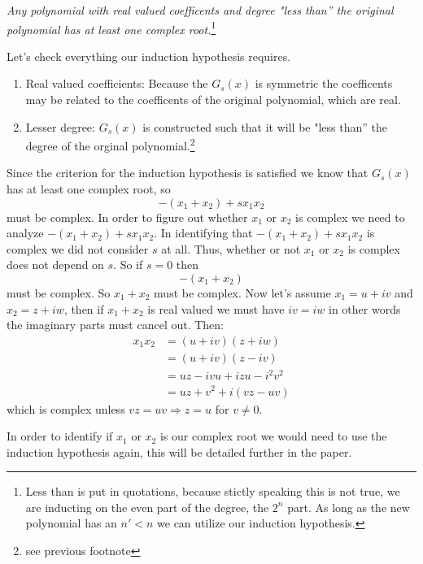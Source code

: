 \documentclass[12pt]{article}
\begin{document}
\emph{Any polynomial with real valued coefficents and degree "less than'' the original polynomial has at least one complex root.}\footnote{Less than is put in quotations, because stictly speaking this is not true, we are inducting on the even part of the degree, the $2^n$ part.  As long as the new polynomial has an $n'<n$ we can utilize our induction hypothesis.}

Let's check everything our induction hypothesis requires.
\begin{enumerate}
\item Real valued coefficients: Because the $G_s(x)$ is symmetric the coefficents may be related to the coefficents of the original polynomial, which are real.
\item Lesser degree: $G_s(x)$ is constructed such that it will be "less than'' the degree of the orginal polynomial.\footnote{see previous footnote}
\end{enumerate}


Since the criterion for the induction hypothesis is satisfied we know that $G_s(x)$ has at least one complex root, so $$-(x_1 +x_2) + s x_1 x_2$$ must be complex.  In order to figure out whether $x_1$ or $x_2$ is complex we need to analyze $-(x_1 +x_2) + s x_1 x_2$.  In identifying that $-(x_1 +x_2) + s x_1 x_2$ is complex we did not consider $s$ at all.  Thus, whether or not $x_1$ or $x_2$ is complex does not depend on $s$.  So if $s=0$ then $$ -(x_1+x_2)$$ must be complex.  So $x_1+x_2$ must be complex.  Now let's assume $x_1 = u+iv$ and $x_2 = z+iw$, then if $x_1+x_2$ is real valued we must have $iv=iw$ in other words the imaginary parts must cancel out.  Then:
\begin{align*}
x_1 x_2 &= (u+iv)(z+iw) \\
&= (u+iv)(z-iv) \\
&= uz - ivu +izu - i^2v^2 \\
&= uz + v^2 + i(vz-uv)
\end{align*}
which is complex unless $vz=uv \Rightarrow z=u$ for $v \neq 0$. 

In order to identify if $x_1$ or $x_2$ is our complex root we would need to use the induction hypothesis again, this will be detailed further in the paper.  




%
%
%
\end{document}
